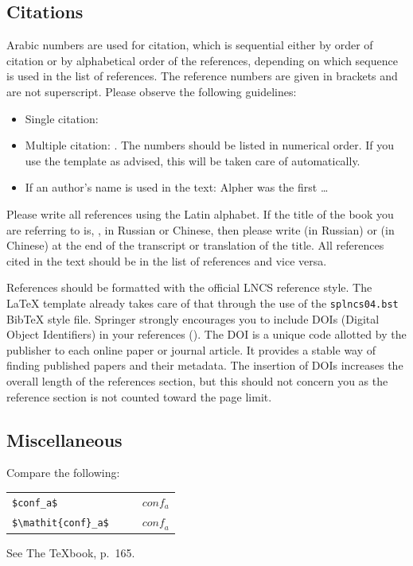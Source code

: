 \documentclass[runningheads]{llncs}
\begin{document}
\subsection{Citations}
Arabic numbers are used for citation, which is sequential either by order of citation or by alphabetical order of the references, depending on which sequence is used in the list of references. 
The reference numbers are given in brackets and are not superscript.
Please observe the following guidelines:
\begin{itemize}
\item Single citation: \cite{Authors14}
\item Multiple citation: \cite{Alpher02,Alpher03,Alpher05,Authors14b,Authors14}. 
  The numbers should be listed in numerical order.
  If you use the template as advised, this will be taken care of automatically.
\item If an author's name is used in the text: Alpher \cite{Alpher02} was the first \ldots
\end{itemize}
Please write all references using the Latin alphabet. If the title of the book you are referring to is, \eg, in Russian or Chinese, then please write (in Russian) or (in Chinese) at the end of the transcript or translation of the title.
All references cited in the text should be in the list of references and vice versa.

References should be formatted with the official LNCS reference style.
The \LaTeX{} template already takes care of that through the use of the \texttt{splncs04.bst} Bib\TeX{} style file.
Springer strongly encourages you to include DOIs (Digital Object Identifiers) in your references (\cf \cite{ECCV2022}). 
The DOI is a unique code allotted by the publisher to each online paper or journal article. 
It provides a stable way of finding published papers and their metadata. 
The insertion of DOIs increases the overall length of the references section, but this should not concern you as the reference section is not counted toward the page limit.


\subsection{Miscellaneous}
Compare the following:
\begin{center}
  \begin{tabular}{ll}
    \verb'$conf_a$'          & $\qquad conf_a$ \\
    \verb'$\mathit{conf}_a$' & $\qquad \mathit{conf}_a$
  \end{tabular}
\end{center}
See The \TeX book, p.\ 165.
\end{document}
